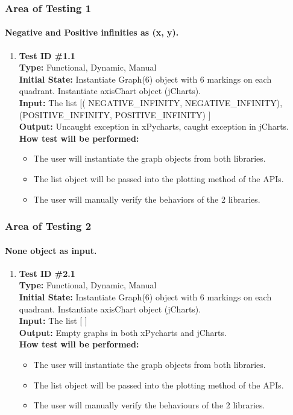 \documentclass[12pt, titlepage]{article}
\begin{document}
\subsubsection{Area of Testing 1}		
	\paragraph{Negative and Positive infinities as (x, y).}
		\begin{enumerate}
			\item{\textbf{Test ID \#1.1\\}}
			\textbf{Type:} Functional, Dynamic, Manual\\
			\textbf{Initial State:} Instantiate Graph(6) object with 6 markings on each quadrant. Instantiate axisChart object (jCharts).\\	
			\textbf{Input:} The list [( NEGATIVE\_INFINITY, NEGATIVE\_INFINITY),  (POSITIVE\_INFINITY, POSITIVE\_INFINITY) ]\\
			\textbf{Output:}  Uncaught exception in xPycharts, caught exception in jCharts.\\
			\textbf{How test will be performed:}
				\begin{itemize}[label={--}]
					\item The user will instantiate the graph objects from both libraries. 
					\item The list object will be passed into the plotting method of the APIs.
					\item The user will manually verify the behaviors of the 2 libraries.
				\end{itemize}					
	\end{enumerate}

\subsubsection{Area of Testing 2}		
	\paragraph{None object as input.}
		\begin{enumerate}
			\item{\textbf{Test ID \#2.1\\}}
			\textbf{Type:} Functional, Dynamic, Manual\\
			\textbf{Initial State:} Instantiate Graph(6) object with 6 markings on each quadrant. Instantiate axisChart object (jCharts).\\	
			\textbf{Input:} The list [ ]\\
			\textbf{Output:}  Empty graphs in both xPycharts and jCharts.\\
			\textbf{How test will be performed:}
				\begin{itemize}[label={--}]
					\item The user will instantiate the graph objects from both libraries. 
					\item The list object will be passed into the plotting method of the APIs.
					\item The user will manually verify the behaviours of the 2 libraries.
				\end{itemize}					
	\end{enumerate}
	
\end{document}
